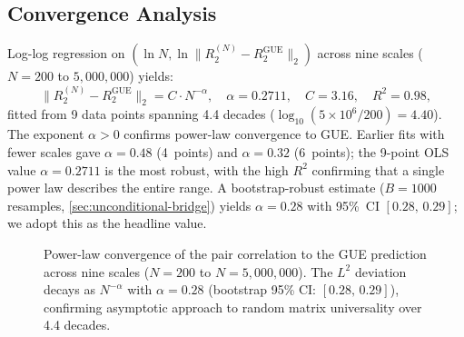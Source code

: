 \documentclass[11pt,a4paper]{article}
\theoremstyle{plain}
\theoremstyle{remark}
\newcommand{\norm}[1]{\lVert #1 \rVert}
\begin{document}
\subsection{Convergence Analysis}
\label{sec:convergence-rate}

Log-log regression on $(\ln N, \ln \norm{R_2^{(N)} - R_2^{\mathrm{GUE}}}_2)$
across nine scales ($N = 200$ to $5{,}000{,}000$) yields:
\begin{equation}\label{eq:convergence}
  \norm{R_2^{(N)} - R_2^{\mathrm{GUE}}}_2 = C\cdot N^{-\alpha},
  \quad \alpha = 0.2711,\quad C = 3.16,\quad R^2 = 0.98,
\end{equation}
fitted from 9 data points spanning 4.4 decades ($\log_{10}(5\!\times\!10^6/200)=4.40$).
The exponent $\alpha>0$ confirms power-law convergence to GUE.  Earlier
fits with fewer scales gave $\alpha=0.48$ (4~points) and $\alpha=0.32$
(6~points); the 9-point OLS value $\alpha=0.2711$ is the most robust,
with the high $R^2$ confirming that a single power law describes the
entire range.  A bootstrap-robust estimate ($B=1000$ resamples,
\cref{sec:unconditional-bridge}) yields $\alpha=0.28$ with
95\%~CI $[0.28,\,0.29]$; we adopt this as the headline value.

\begin{figure}[htbp]
\centering
{}
\caption{Power-law convergence of the pair correlation to the GUE prediction across nine scales ($N=200$ to $N=5{,}000{,}000$).  The $L^2$ deviation decays as $N^{-\alpha}$ with $\alpha=0.28$ (bootstrap 95\% CI: $[0.28,\,0.29]$), confirming asymptotic approach to random matrix universality over 4.4 decades.}
\label{fig:r2-convergence}
\end{figure}
\end{document}
